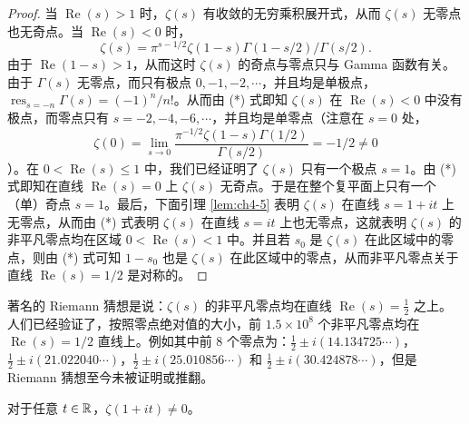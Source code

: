 \begin{proof}
当 $\operatorname{Re}(s)>1$ 时，$\zeta(s)$ 有收敛的无穷乘积展开式，从而 $\zeta(s)$ 无零点也无奇点。当 $\operatorname{Re}(s)<0$ 时，
\begin{equation}\tag{*}
  \zeta(s)=\pi^{s-1/2}\zeta(1-s)\Gamma(1-s/2)/\Gamma(s/2).
\end{equation}
由于 $\operatorname{Re}(1-s)>1$，从而这时 $\zeta(s)$ 的奇点与零点只与 Gamma 函数有关。由于 $\Gamma(s)$ 无零点，而只有极点 $0,-1,-2,\cdots$，并且均是单极点，$\operatorname{res}_{s=-n}\Gamma(s)=(-1)^n/n!$。从而由 (*) 式即知 $\zeta(s)$ 在 $\operatorname{Re}(s)<0$ 中没有极点，而零点只有 $s=-2,-4,-6,\cdots$，并且均是单零点（注意在 $s=0$ 处，
\[
  \zeta(0)=\lim_{s\to0}\frac{\pi^{-1/2}\zeta(1-s)\Gamma(1/2)}{\Gamma(s/2)}=-1/2\neq 0
\]
）。在 $0<\operatorname{Re}(s)\leqslant 1$ 中，我们已经证明了 $\zeta(s)$ 只有一个极点 $s=1$。由 (*) 式即知在直线 $\operatorname{Re}(s)=0$ 上 $\zeta(s)$ 无奇点。于是在整个复平面上只有一个（单）奇点 $s=1$。最后，下面引理 \ref{lem:ch4-5} 表明 $\zeta(s)$ 在直线 $s=1+it$ 上无零点，从而由 (*) 式表明 $\zeta(s)$ 在直线 $s=it$ 上也无零点，这就表明 $\zeta(s)$ 的非平凡零点均在区域 $0<\operatorname{Re}(s)<1$ 中。并且若 $s_0$ 是 $\zeta(s)$ 在此区域中的零点，则由 (*) 式可知 $1-s_0$ 也是 $\zeta(s)$ 在此区域中的零点，从而非平凡零点关于直线 $\operatorname{Re}(s)=1/2$ 是对称的。
\end{proof}

\begin{remark}
著名的 Riemann 猜想是说：$\zeta(s)$ 的非平凡零点均在直线 $\operatorname{Re}(s)=\frac{1}{2}$ 之上。人们已经验证了，按照零点绝对值的大小，前 $1.5\times10^8$ 个非平凡零点均在 $\operatorname{Re}(s)=1/2$ 直线上。例如其中前 $8$ 个零点为：$\frac{1}{2}\pm i(14.134725\cdots)$，$\frac{1}{2}\pm i(21.022040\cdots)$，$\frac{1}{2}\pm i(25.010856\cdots)$ 和 $\frac{1}{2}\pm i(30.424878\cdots)$，但是 Riemann 猜想至今未被证明或推翻。
\end{remark}

\begin{lemma}\label{lem:ch4-5}
对于任意 $t\in\mathbb{R}$，$\zeta(1+it)\neq 0$。
\end{lemma}

